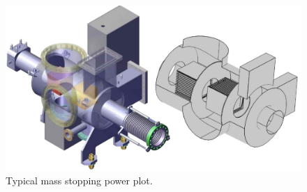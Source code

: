 \begin{figure}[ht]
	\includegraphics[width=\textwidth]{03_Prototype/figures/00_fig/fig003_COMSOL_LWU.jpeg}
	\caption[Typical mass stopping power plot]{Typical mass stopping power plot.}
	\label{chap3:maxwell_gas_log1}
\end{figure}
